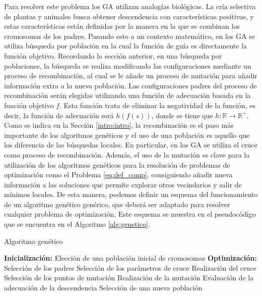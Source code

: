 Para resolver este problema los GA utilizan analogías biológicas. La cría selectiva de plantas y animales busca obtener descendencia con características positivas, y estas características están definidas por la manera en la que se combinan los cromosomas de los padres. Pasando esto a un contexto matemático, en los GA se utiliza búsqueda por población en la cual la función de guía es directamente la función objetivo. Recordando la sección anterior, en una búsqueda por poblaciones, la búsqueda se realiza modificando las configuraciones mediante un proceso de recombinación, al cual se le añade un proceso de mutación para añadir información extra a la nueva población. Las configuraciones padres del proceso de recombinación serán elegidas utilizando una función de adecuación basada en la función objetivo $f$. Esta función trata de eliminar la negatividad de la función, es decir, la función de adecuación será $h(f(s))$, donde se tiene que $h:\mathbb{R}\rightarrow\mathbb{R}^+$.\\

Como se indica en la Sección \ref{intro:intro}, la recombinación es el paso más importante de los algoritmos genéticos y el uso de una población es aquello que los diferencia de las búsquedas locales. En particular, en los GA se utiliza el cruce como proceso de recombinación. Además, el uso de la mutación es clave para la utilización de los algoritmos genéticos para la resolución de problemas de optimización como el Problema \ref{eq:def_comp}, consiguiendo añadir nueva información a las soluciones que permite explorar otros vecindarios y salir de mínimos locales. De esta manera, podemos definir un esquema del funcionamiento de un algoritmo genético genérico, que deberá ser adaptado para resolver cualquier problema de optimización. Este esquema se muestra en el pseudocódigo que se encuentra en el Algoritmo \ref{alg:genetico}.

\begin{algorithm}[!htb]
    \caption{Algoritmo genético}
    \label{alg:genetico}
    \begin{algorithmic}[1]
        \State \textbf{Inicialización:}
        \State Elección de una población inicial de cromosomas
        \State \textbf{Optimización:}
            \Repeat 
                    \State Selección de los padres
                    \State Selección de los parámetros de cruce
                    \State Realización del cruce
                \EndIf
                    \State Selección de los puntos de mutación
                    \State Realización de la mutación
                \EndIf
                \State Evaluación de la adecuación de la descendencia
            \State Selección de una nueva población
        \EndWhile
    \end{algorithmic}
\end{algorithm}

